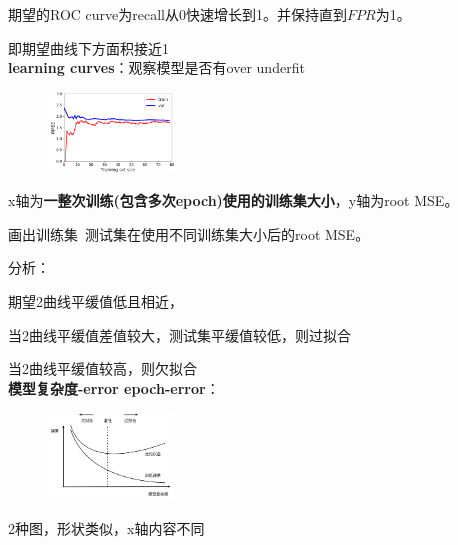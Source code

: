\documentclass[UTF8]{ctexart}
\begin{document}
  期望的ROC curve为recall从0快速增长到1。并保持直到$FPR$为1。
  
  \quad 即期望曲线下方面积接近1\\
\textbf{learning curves}：观察模型是否有over underfit

  \begin{figure}[H] %
    \centering %
    \includegraphics[width=0.3\textwidth]{note_images/learning_curve.png} %
  \end{figure}

  x轴为\textbf{一整次训练(包含多次epoch)使用的训练集大小}，y轴为root MSE。

  画出训练集\ 测试集在使用不同训练集大小后的root MSE。

  分析：

  \quad 期望2曲线平缓值低且相近，

  \quad 当2曲线平缓值差值较大，测试集平缓值较低，则过拟合

  \quad 当2曲线平缓值较高，则欠拟合\\
\textbf{模型复杂度-error epoch-error}：

  \begin{figure}[H] %
    \centering %
    \includegraphics[width=0.3\textwidth]{note_images/epoch-complex-error.png} %
  \end{figure}

  2种图，形状类似，x轴内容不同\\
\end{document}
